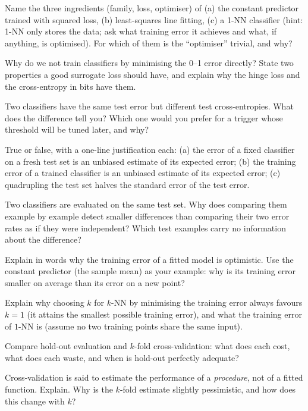 \documentclass[11pt]{article}
\begin{document}
\begin{questions}
\begin{conceptual}
\item Name the three ingredients (family, loss, optimiser) of (a) the constant predictor trained with squared loss,
(b) least-squares line fitting, (c) a 1-NN classifier (hint: 1-NN only stores the data; ask what training error it
achieves and what, if anything, is optimised). For which of them is the ``optimiser'' trivial, and why?
\item Why do we not train classifiers by minimising the 0--1 error directly? State two properties a good surrogate
loss should have, and explain why the hinge loss and the cross-entropy in bits have them.
\item Two classifiers have the same test error but different test cross-entropies. What does the difference tell
you? Which one would you prefer for a trigger whose threshold will be tuned later, and why?
\item True or false, with a one-line justification each: (a) the error of a fixed classifier on a fresh test set is an
unbiased estimate of its expected error; (b) the training error of a trained classifier is an unbiased estimate of
its expected error; (c) quadrupling the test set halves the standard error of the test error.
\item Two classifiers are evaluated on the same test set. Why does comparing them example by example detect smaller
differences than comparing their two error rates as if they were independent? Which test examples carry no
information about the difference?
\item Explain in words why the training error of a fitted model is optimistic. Use the constant predictor (the
sample mean) as your example: why is its training error smaller on average than its error on a new point?
\item Explain why choosing $k$ for $k$-NN by minimising the training error always favours $k = 1$ (it attains the
smallest possible training error), and what the training error of $1$-NN is (assume no two training points share the
same input).
\item Compare hold-out evaluation and $k$-fold cross-validation: what does each cost, what does each waste, and when
is hold-out perfectly adequate?
\item Cross-validation is said to estimate the performance of a \emph{procedure}, not of a fitted function. Explain.
Why is the $k$-fold estimate slightly pessimistic, and how does this change with $k$?

\end{conceptual}
\end{questions}
\end{document}
